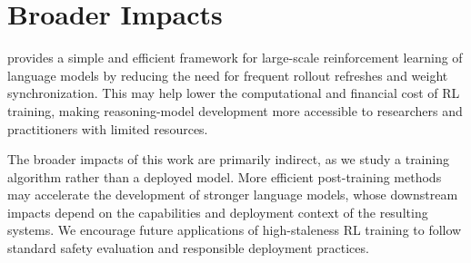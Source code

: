 \section{Broader Impacts}
\label{app:broader_impacts}

\ourmethod{} provides a simple and efficient framework for large-scale reinforcement learning of language models by reducing the need for frequent rollout refreshes and weight synchronization. This may help lower the computational and financial cost of RL training, making reasoning-model development more accessible to researchers and practitioners with limited resources.

The broader impacts of this work are primarily indirect, as we study a training algorithm rather than a deployed model. More efficient post-training methods may accelerate the development of stronger language models, whose downstream impacts depend on the capabilities and deployment context of the resulting systems. We encourage future applications of high-staleness RL training to follow standard safety evaluation and responsible deployment practices.